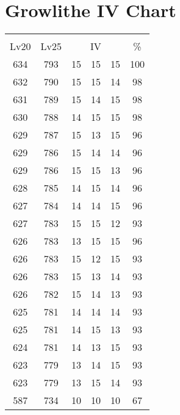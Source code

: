 \documentclass{article}%
\begin{document}
%
\normalsize%
\section{Growlithe IV Chart}%
\label{sec:Growlithe IV Chart}%
\renewcommand{\arraystretch}{1.5}%
\begin{tabular}{|c|c|c|c|c|c|}%
\hline%
\multicolumn{6}{|c|}{\textcolor{white}{ 
\linebreak{Growlithe}
}%
\cellcolor{black}}\\%
\multicolumn{1}{|c}{Lv20}&\multicolumn{1}{c|}{Lv25}&\multicolumn{3}{c|}{IV}&\multicolumn{1}{|c|}{\%}\\%
\hline%
\rowcolor{color100}%
634&793&15&15&15&100\\%
\hline%
\rowcolor{color98}%
632&790&15&15&14&98\\%
\hline%
\rowcolor{color98}%
631&789&15&14&15&98\\%
\hline%
\rowcolor{color98}%
630&788&14&15&15&98\\%
\hline%
\rowcolor{color96}%
629&787&15&13&15&96\\%
\hline%
\rowcolor{color96}%
629&786&15&14&14&96\\%
\hline%
\rowcolor{color96}%
629&786&15&15&13&96\\%
\hline%
\rowcolor{color96}%
628&785&14&15&14&96\\%
\hline%
\rowcolor{color96}%
627&784&14&14&15&96\\%
\hline%
\rowcolor{color93}%
627&783&15&15&12&93\\%
\hline%
\rowcolor{color96}%
626&783&13&15&15&96\\%
\hline%
\rowcolor{color93}%
626&783&15&12&15&93\\%
\hline%
\rowcolor{color93}%
626&783&15&13&14&93\\%
\hline%
\rowcolor{color93}%
626&782&15&14&13&93\\%
\hline%
\rowcolor{color93}%
625&781&14&14&14&93\\%
\hline%
\rowcolor{color93}%
625&781&14&15&13&93\\%
\hline%
\rowcolor{color93}%
624&781&14&13&15&93\\%
\hline%
\rowcolor{color93}%
623&779&13&14&15&93\\%
\hline%
\rowcolor{color93}%
623&779&13&15&14&93\\%
\hline%
\rowcolor{color91}%
587&734&10&10&10&67\\%
\end{tabular}

%
\end{document}
